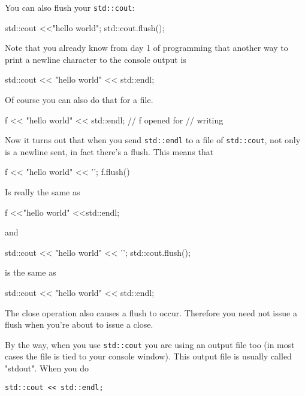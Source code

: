 \begin{consolethree}[escapeinside=||]
You can also flush your \texttt{std::cout}:

\begin{console}
std::cout <<"hello world";
std::cout.flush();
\end{console}

Note that you already know from day 1 of programming that another way to
print a newline character to the console output is

\begin{console}
std::cout << "hello world" << std::endl;
\end{console}

Of course you can also do that for a file.

\begin{console}
f << "hello world" << std::endl; // f opened for
                                 // writing 
\end{console}

Now it turns out that when you send \texttt{std::endl} to a file of \texttt{std::cout}, not only is a newline sent, in fact there's a flush. This means that

\begin{console}
f << "hello world" << '\n';
f.flush() 
\end{console}

Is really the same as

\begin{console}
f <<"hello world" <<std::endl;
\end{console}

and

\begin{console}
std::cout << "hello world" << '\n';
std::cout.flush();
\end{console}

is the same as

\begin{console} 
std::cout << "hello world" << std::endl;
\end{console}

The close operation also causes a flush to occur. Therefore you need not issue a flush when you're about to issue a close.

By the way, when you use \texttt{std::cout} you are using an output file too (in most cases the file is tied to your console window). This output file is usually called "stdout". When you do

\begin{center}
\texttt{std::cout << std::endl;}
\end{center}


\end{consolethree}
